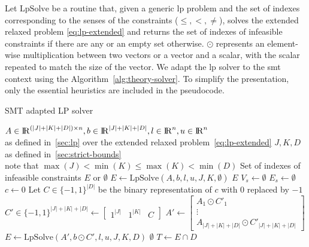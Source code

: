 \documentclass[runningheads]{llncs}
\begin{document}
Let $\text{LpSolve}$ be a routine that, given a generic \gls{lp} problem and the set of indexes corresponding to the senses of the constraints ($\le, <, \ne$), solves the extended relaxed problem \eqref{eq:lp-extended} and returns the set of indexes of infeasible constraints if there are any or an empty set otherwise.
$\odot$ represents an element-wise multiplication between two vectors or a vector and a scalar, with the scalar repeated to match the size of the vector.
We adapt the \gls{lp} solver to the \gls{smt} context using the Algorithm~\ref{alg:theory-solver}.
To simplify the presentation, only the essential heuristics are included in the pseudocode.
\begin{algorithm}
    \caption{SMT adapted LP solver}\label{alg:theory-solver}
    \begin{algorithmic}
        \Require $A \in {\rm I\!R}^{(|J| + |K| + |D|) \times n}, b \in {\rm I\!R}^{|J| + |K| + |D|}, l \in {\rm I\!R}^n, u \in {\rm I\!R}^n$ \\
        \qquad as defined in~\autoref{sec:lp} over the extended relaxed problem~\eqref{eq:lp-extended}
        \Require $J, K, D$ as defined in~\autoref{sec:strict-bounds} \\
        \qquad note that $\max(J) < \min(K) \le \max(K) < \min(D)$
        \Ensure Set of indexes of infeasible constraints $E$ or $\emptyset$
        \State $E \gets \text{LpSolve}(A, b, l, u, J, K, \emptyset)$ 
        \State \Return $E$
        \EndIf
        \State $V_s \gets \emptyset$
        \State $E_s \gets \emptyset$
        \EndFor
        \State $c \gets 0$ 
        \State Let $C \in \{-1, 1\}^{|D|}$ be the binary representation of $c$ with $0$ replaced by $-1$
        \State $C' \in \{-1, 1\}^{|J|+|K|+|D|} \gets \begin{bmatrix} 1^{|J|} & 1^{|K|} & C\end{bmatrix}$
        \State $A' \gets \begin{bmatrix}A_1 \odot C'_1 \\ \vdots \\ A_{|J|+|K|+|D|} \odot C'_{|J|+|K|+|D|}\end{bmatrix}$
        \State $E \gets \text{LpSolve}(A', b \odot C', l, u, J, K, D)$
         
        \State \Return $\emptyset$
        \EndIf
        \State $T \gets E \cap D$

\end{algorithmic}
\end{algorithm}
\end{document}
